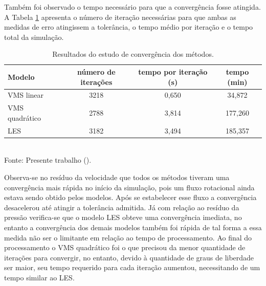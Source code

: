 Também foi observado o tempo necessário para que a convergência fosse atingida. A Tabela \ref{tab:comp-res} apresenta o número de iteração necessárias para que ambas as medidas de erro atingissem a tolerância, o tempo médio por iteração e o tempo total da simulação.

\begin{table}[h!]
    \centering
    \caption{Resultados do estudo de convergência dos métodos.}
    \begin{tabular}{lccc}
        \hline
        Modelo         & número de iterações & tempo por iteração (s) & tempo (min) \\\hline
        VMS linear     & 3218                & 0,650                  & 34,872      \\
        VMS quadrático & 2788                & 3,814                  & 177,260     \\
        LES            & 3182                & 3,494                  & 185,357     \\\hline
    \end{tabular}
    \\Fonte: Presente trabalho (\the\year).
    \label{tab:comp-res}
\end{table}

Observa-se no resíduo da velocidade que todos os métodos tiveram uma convergência mais rápida no início da simulação, pois um fluxo rotacional ainda estava sendo obtido pelos modelos. Após se estabelecer esse fluxo a convergência desacelerou até atingir a tolerância admitida. Já com relação ao resíduo da pressão verifica-se que o modelo LES obteve uma convergência imediata, no entanto a convergência dos demais modelos também foi rápida de tal forma a essa medida não ser o limitante em relação ao tempo de processamento. Ao final do processamento o VMS quadrático foi o que precisou da menor quantidade de iterações para convergir, no entanto, devido à quantidade de graus de liberdade ser maior, seu tempo requerido para cada iteração aumentou, necessitando de um tempo similar ao LES.